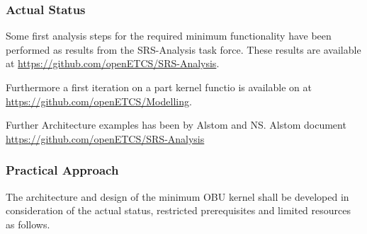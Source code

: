 \subsubsection{Actual Status}
\label{sec:ActualStatus}

Some first analysis steps for the required minimum functionality have been performed as results from the SRS-Analysis task force. These results are available at \url{https://github.com/openETCS/SRS-Analysis}.

Furthermore a first iteration on a part kernel functio is available on at \url{https://github.com/openETCS/Modelling}.

Further Architecture examples has been by Alstom and NS.
Alstom document \url{https://github.com/openETCS/SRS-Analysis}


\subsubsection{Practical Approach}
\label{sec:PracticalApproach}

The architecture and design of the minimum OBU kernel shall be developed in consideration of the actual status, restricted prerequisites and limited resources as follows. 
